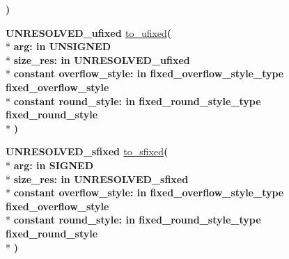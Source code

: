 \begin{DoxyCompactItemize}
{\bfseries  )} 
\item 
{\bfseries {\bfseries \textcolor{vhdlchar}{U\+N\+R\+E\+S\+O\+L\+V\+E\+D\+\_\+ufixed}\textcolor{vhdlchar}{ }}} \hyperlink{class__fixed__pkg_ade2913ec678d66be09db3a25d30ded44}{to\+\_\+ufixed}{\bfseries  ( }\\*
{\bfseries \textcolor{vhdlchar}{arg\+: }\textcolor{stringliteral}{in }{\bfseries \textcolor{comment}{U\+N\+S\+I\+G\+N\+E\+D}\textcolor{vhdlchar}{ }}}\\*
{\bfseries \textcolor{vhdlchar}{size\+\_\+res\+: }\textcolor{stringliteral}{in }\textcolor{vhdlchar}{U\+N\+R\+E\+S\+O\+L\+V\+E\+D\+\_\+ufixed}}\\*
{\bfseries {\bfseries \textcolor{keywordflow}{constant}\textcolor{vhdlchar}{ }}\textcolor{vhdlchar}{overflow\+\_\+style\+: }\textcolor{stringliteral}{in }\textcolor{vhdlchar}{fixed\+\_\+overflow\+\_\+style\+\_\+type     fixed\+\_\+overflow\+\_\+style}}\\*
{\bfseries {\bfseries \textcolor{keywordflow}{constant}\textcolor{vhdlchar}{ }}\textcolor{vhdlchar}{round\+\_\+style\+: }\textcolor{stringliteral}{in }\textcolor{vhdlchar}{fixed\+\_\+round\+\_\+style\+\_\+type     fixed\+\_\+round\+\_\+style}}\\*
{\bfseries  )} 
\item 
{\bfseries {\bfseries \textcolor{vhdlchar}{U\+N\+R\+E\+S\+O\+L\+V\+E\+D\+\_\+sfixed}\textcolor{vhdlchar}{ }}} \hyperlink{class__fixed__pkg_a575822ec305f0e37fa911df9b379bf4c}{to\+\_\+sfixed}{\bfseries  ( }\\*
{\bfseries \textcolor{vhdlchar}{arg\+: }\textcolor{stringliteral}{in }{\bfseries \textcolor{comment}{S\+I\+G\+N\+E\+D}\textcolor{vhdlchar}{ }}}\\*
{\bfseries \textcolor{vhdlchar}{size\+\_\+res\+: }\textcolor{stringliteral}{in }\textcolor{vhdlchar}{U\+N\+R\+E\+S\+O\+L\+V\+E\+D\+\_\+sfixed}}\\*
{\bfseries {\bfseries \textcolor{keywordflow}{constant}\textcolor{vhdlchar}{ }}\textcolor{vhdlchar}{overflow\+\_\+style\+: }\textcolor{stringliteral}{in }\textcolor{vhdlchar}{fixed\+\_\+overflow\+\_\+style\+\_\+type     fixed\+\_\+overflow\+\_\+style}}\\*
{\bfseries {\bfseries \textcolor{keywordflow}{constant}\textcolor{vhdlchar}{ }}\textcolor{vhdlchar}{round\+\_\+style\+: }\textcolor{stringliteral}{in }\textcolor{vhdlchar}{fixed\+\_\+round\+\_\+style\+\_\+type     fixed\+\_\+round\+\_\+style}}\\*
{\bfseries  )} 
\item 

\end{DoxyCompactItemize}
